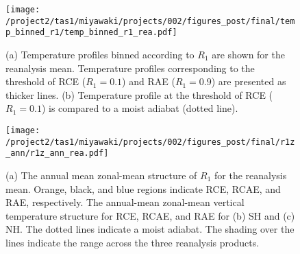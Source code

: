 \documentclass{ametsocV5}
\begin{document}

\begin{figure}
  \noindent\texttt{[image: /project2/tas1/miyawaki/projects/002/figures\_post/final/temp\_binned\_r1/temp\_binned\_r1\_rea.pdf]}\\
  \caption{(a) Temperature profiles binned according to $R_{1}$ are shown for the reanalysis mean. Temperature profiles corresponding to the threshold of RCE ($R_1=0.1$) and RAE ($R_1=0.9$) are presented as thicker lines. (b) Temperature profile at the threshold of RCE ($R_1=0.1$) is compared to a moist adiabat (dotted line).}
  \label{fig:rea-binned-r1}
\end{figure}


\begin{figure}[t]
  \noindent\texttt{[image: /project2/tas1/miyawaki/projects/002/figures\_post/final/r1z\_ann/r1z\_ann\_rea.pdf]}\\
  \caption{(a) The annual mean zonal-mean structure of $R_{1}$ for the reanalysis mean. Orange, black, and blue regions indicate RCE, RCAE, and RAE, respectively. The annual-mean zonal-mean vertical temperature structure for RCE, RCAE, and RAE for (b) SH and (c) NH. The dotted lines indicate a moist adiabat. The shading over the lines indicate the range across the three reanalysis products.}
  \label{fig:rea-r1-ann}
\end{figure}
\end{document}
